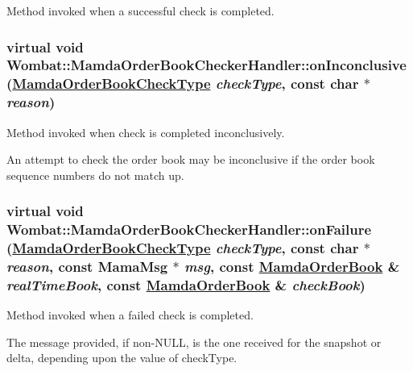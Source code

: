 Method invoked when a successful check is completed. 

\hypertarget{classWombat_1_1MamdaOrderBookCheckerHandler_c85eae2e0dfb1167f7cbec2a9204bea8}{
\subsubsection[onInconclusive]{\setlength{\rightskip}{0pt plus 5cm}virtual void Wombat::Mamda\-Order\-Book\-Checker\-Handler::on\-Inconclusive (\hyperlink{namespaceWombat_6f15e7af875f3469c5fb0afe58b21667}{Mamda\-Order\-Book\-Check\-Type} {\em check\-Type}, const char $\ast$ {\em reason})}}
\label{classWombat_1_1MamdaOrderBookCheckerHandler_c85eae2e0dfb1167f7cbec2a9204bea8}


Method invoked when check is completed inconclusively. 

An attempt to check the order book may be inconclusive if the order book sequence numbers do not match up. \hypertarget{classWombat_1_1MamdaOrderBookCheckerHandler_66f7e02589afd6749e8765a80c997f4a}{
\subsubsection[onFailure]{\setlength{\rightskip}{0pt plus 5cm}virtual void Wombat::Mamda\-Order\-Book\-Checker\-Handler::on\-Failure (\hyperlink{namespaceWombat_6f15e7af875f3469c5fb0afe58b21667}{Mamda\-Order\-Book\-Check\-Type} {\em check\-Type}, const char $\ast$ {\em reason}, const Mama\-Msg $\ast$ {\em msg}, const \hyperlink{classWombat_1_1MamdaOrderBook}{Mamda\-Order\-Book} \& {\em real\-Time\-Book}, const \hyperlink{classWombat_1_1MamdaOrderBook}{Mamda\-Order\-Book} \& {\em check\-Book})}}
\label{classWombat_1_1MamdaOrderBookCheckerHandler_66f7e02589afd6749e8765a80c997f4a}


Method invoked when a failed check is completed. 

The message provided, if non-NULL, is the one received for the snapshot or delta, depending upon the value of check\-Type. 